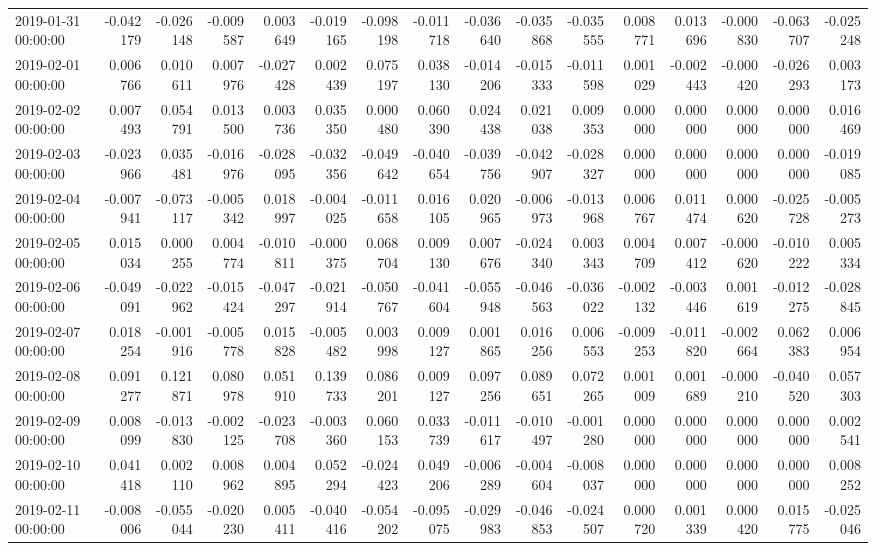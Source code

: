 \begin{tabular}{lrrrrrrrrrrrrrrr}
2019-01-31 00:00:00 & -0.042179 & -0.026148 & -0.009587 & 0.003649 & -0.019165 & -0.098198 & -0.011718 & -0.036640 & -0.035868 & -0.035555 & 0.008771 & 0.013696 & -0.000830 & -0.063707 & -0.025248 \\
2019-02-01 00:00:00 & 0.006766 & 0.010611 & 0.007976 & -0.027428 & 0.002439 & 0.075197 & 0.038130 & -0.014206 & -0.015333 & -0.011598 & 0.001029 & -0.002443 & -0.000420 & -0.026293 & 0.003173 \\
2019-02-02 00:00:00 & 0.007493 & 0.054791 & 0.013500 & 0.003736 & 0.035350 & 0.000480 & 0.060390 & 0.024438 & 0.021038 & 0.009353 & 0.000000 & 0.000000 & 0.000000 & 0.000000 & 0.016469 \\
2019-02-03 00:00:00 & -0.023966 & 0.035481 & -0.016976 & -0.028095 & -0.032356 & -0.049642 & -0.040654 & -0.039756 & -0.042907 & -0.028327 & 0.000000 & 0.000000 & 0.000000 & 0.000000 & -0.019085 \\
2019-02-04 00:00:00 & -0.007941 & -0.073117 & -0.005342 & 0.018997 & -0.004025 & -0.011658 & 0.016105 & 0.020965 & -0.006973 & -0.013968 & 0.006767 & 0.011474 & 0.000620 & -0.025728 & -0.005273 \\
2019-02-05 00:00:00 & 0.015034 & 0.000255 & 0.004774 & -0.010811 & -0.000375 & 0.068704 & 0.009130 & 0.007676 & -0.024340 & 0.003343 & 0.004709 & 0.007412 & -0.000620 & -0.010222 & 0.005334 \\
2019-02-06 00:00:00 & -0.049091 & -0.022962 & -0.015424 & -0.047297 & -0.021914 & -0.050767 & -0.041604 & -0.055948 & -0.046563 & -0.036022 & -0.002132 & -0.003446 & 0.001619 & -0.012275 & -0.028845 \\
2019-02-07 00:00:00 & 0.018254 & -0.001916 & -0.005778 & 0.015828 & -0.005482 & 0.003998 & 0.009127 & 0.001865 & 0.016256 & 0.006553 & -0.009253 & -0.011820 & -0.002664 & 0.062383 & 0.006954 \\
2019-02-08 00:00:00 & 0.091277 & 0.121871 & 0.080978 & 0.051910 & 0.139733 & 0.086201 & 0.009127 & 0.097256 & 0.089651 & 0.072265 & 0.001009 & 0.001689 & -0.000210 & -0.040520 & 0.057303 \\
2019-02-09 00:00:00 & 0.008099 & -0.013830 & -0.002125 & -0.023708 & -0.003360 & 0.060153 & 0.033739 & -0.011617 & -0.010497 & -0.001280 & 0.000000 & 0.000000 & 0.000000 & 0.000000 & 0.002541 \\
2019-02-10 00:00:00 & 0.041418 & 0.002110 & 0.008962 & 0.004895 & 0.052294 & -0.024423 & 0.049206 & -0.006289 & -0.004604 & -0.008037 & 0.000000 & 0.000000 & 0.000000 & 0.000000 & 0.008252 \\
2019-02-11 00:00:00 & -0.008006 & -0.055044 & -0.020230 & 0.005411 & -0.040416 & -0.054202 & -0.095075 & -0.029983 & -0.046853 & -0.024507 & 0.000720 & 0.001339 & 0.000420 & 0.015775 & -0.025046 \\

\end{tabular}
